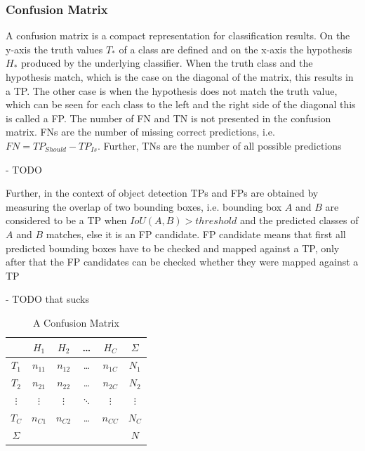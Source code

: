 \subsubsection{Confusion Matrix}

A confusion matrix is a compact representation for classification results.
On the y-axis the truth values $T_*$ of a class are defined and on the x-axis the hypothesis $H_*$ produced by the underlying classifier.
When the truth class and the hypothesis match, which is the case on the diagonal of the matrix, this results in a \ac{TP}.
The other case is when the hypothesis does not match the truth value, which can be seen for each class to the left and the right side of the diagonal this is called a \ac{FP}.
The number of \ac{FN} and \ac{TN} is not presented in the confusion matrix.
\acp{FN} are the number of missing correct predictions, i.e. $FN = TP_{Should} - TP_{Is}$.
Further, \acp{TN} are the number of all possible predictions

- TODO

Further, in the context of object detection \acp{TP} and \acp{FP} are obtained by measuring the overlap of two bounding boxes, i.e. bounding box $A$ and $B$ are considered to be a \ac{TP} when $IoU(A, B) > threshold$ and the predicted classes of $A$ and $B$ matches, else it is an \ac{FP} candidate.
\ac{FP} candidate means that first all predicted bounding boxes have to be checked and mapped against a \ac{TP}, only after that the \ac{FP} candidates can be checked whether they were mapped against a \ac{TP}

- TODO that sucks


\begin{table}
\begin{center}
\begin{tabular}{c | c c c c | c}
    & \textbf{$H_1$} & \textbf{$H_2$} & \textbf{\ldots} & \textbf{$H_C$} & {$\Sigma$} \\
    \hline
    $T_1$ & \cellcolor{green}$n_{11}$ & $n_{12}$ & \ldots & $n_{1C}$ & $N_1$\\
    $T_2$ & $n_{21}$ & \cellcolor{green}$n_{22}$ & \ldots & $n_{2C}$ & $N_2$\\
    \textbf{$\vdots$} & $\vdots$ & $\vdots$ & \cellcolor{green}$\ddots$ & $\vdots$ & \textbf{$\vdots$} \\
    $T_C$ & $n_{C1}$ & $n_{C2}$ & \ldots &\cellcolor{green} $n_{CC}$ & $N_C$\\
    \hline
    $\Sigma$  & & & & & $N$\\
\end{tabular}
\caption{A Confusion Matrix}
\label{tab:confmat}
\end{center}
\end{table}

